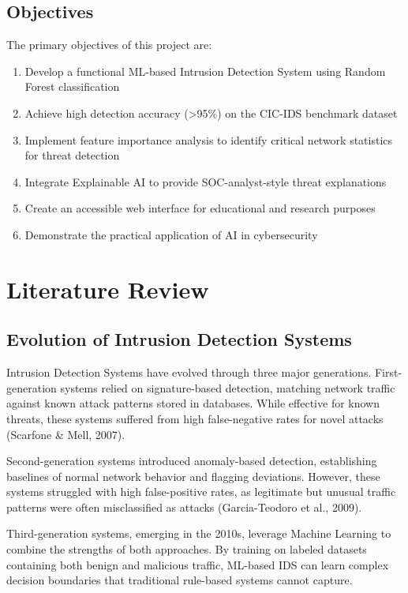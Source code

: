 \documentclass[12pt,a4paper]{article}
\begin{document}
\subsection{Objectives}

The primary objectives of this project are:

\begin{enumerate}
    \item Develop a functional ML-based Intrusion Detection System using Random Forest classification
    \item Achieve high detection accuracy (>95\%) on the CIC-IDS benchmark dataset
    \item Implement feature importance analysis to identify critical network statistics for threat detection
    \item Integrate Explainable AI to provide SOC-analyst-style threat explanations
    \item Create an accessible web interface for educational and research purposes
    \item Demonstrate the practical application of AI in cybersecurity
\end{enumerate}

\section{Literature Review}

\subsection{Evolution of Intrusion Detection Systems}

Intrusion Detection Systems have evolved through three major generations. First-generation systems relied on signature-based detection, matching network traffic against known attack patterns stored in databases. While effective for known threats, these systems suffered from high false-negative rates for novel attacks (Scarfone \& Mell, 2007).

Second-generation systems introduced anomaly-based detection, establishing baselines of normal network behavior and flagging deviations. However, these systems struggled with high false-positive rates, as legitimate but unusual traffic patterns were often misclassified as attacks (Garcia-Teodoro et al., 2009).

Third-generation systems, emerging in the 2010s, leverage Machine Learning to combine the strengths of both approaches. By training on labeled datasets containing both benign and malicious traffic, ML-based IDS can learn complex decision boundaries that traditional rule-based systems cannot capture.
\end{document}
